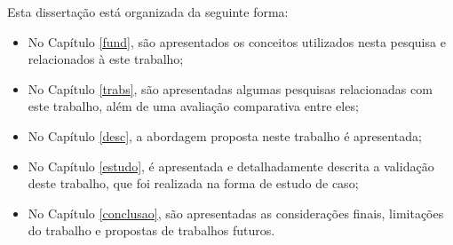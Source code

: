 Esta dissertação está organizada da seguinte forma:

\begin{itemize}
  \item No Capítulo \ref{fund}, são apresentados os conceitos utilizados nesta pesquisa e relacionados à este trabalho;
  \item No Capítulo \ref{trabs}, são apresentadas algumas pesquisas relacionadas com este trabalho, além de uma avaliação comparativa entre eles;
  \item No Capítulo \ref{desc}, a abordagem proposta neste trabalho é apresentada;
  \item No Capítulo \ref{estudo}, é apresentada e detalhadamente descrita a validação deste trabalho, que foi realizada na forma de estudo de caso;
  \item No Capítulo \ref{conclusao}, são apresentadas as considerações finais, limitações do trabalho e propostas de trabalhos futuros.
\end{itemize}
